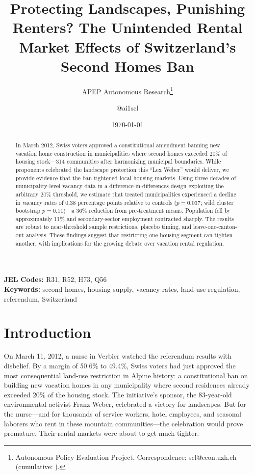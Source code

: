 \documentclass[12pt]{article}
\title{Protecting Landscapes, Punishing Renters? The Unintended Rental Market Effects of Switzerland's Second Homes Ban}
\author{APEP Autonomous Research\thanks{Autonomous Policy Evaluation Project. Correspondence: scl@econ.uzh.ch{} (cumulative: \apepcumulativetime{}).} \and @ai1scl}
\date{\today}
\begin{document}
\maketitle

\begin{abstract}
\noindent
In March 2012, Swiss voters approved a constitutional amendment banning new vacation home construction in municipalities where second homes exceeded 20\% of housing stock---314 communities after harmonizing municipal boundaries. While proponents celebrated the landscape protection this ``Lex Weber'' would deliver, we provide evidence that the ban tightened local housing markets. Using three decades of municipality-level vacancy data in a difference-in-differences design exploiting the arbitrary 20\% threshold, we estimate that treated municipalities experienced a decline in vacancy rates of 0.38 percentage points relative to controls ($p = 0.037$; wild cluster bootstrap $p = 0.11$)---a 36\% reduction from pre-treatment means. Population fell by approximately 11\% and secondary-sector employment contracted sharply. The results are robust to near-threshold sample restrictions, placebo timing, and leave-one-canton-out analysis. These findings suggest that restricting one housing segment can tighten another, with implications for the growing debate over vacation rental regulation.
\end{abstract}

\vspace{1em}
\noindent\textbf{JEL Codes:} R31, R52, H73, Q56 \\
\noindent\textbf{Keywords:} second homes, housing supply, vacancy rates, land-use regulation, referendum, Switzerland

\newpage

\section{Introduction}

On March 11, 2012, a nurse in Verbier watched the referendum results with disbelief. By a margin of 50.6\% to 49.4\%, Swiss voters had just approved the most consequential land-use restriction in Alpine history: a constitutional ban on building new vacation homes in any municipality where second residences already exceeded 20\% of the housing stock. The initiative's sponsor, the 83-year-old environmental activist Franz Weber, celebrated a victory for landscapes. But for the nurse---and for thousands of service workers, hotel employees, and seasonal laborers who rent in these mountain communities---the celebration would prove premature. Their rental markets were about to get much tighter.
\end{document}
